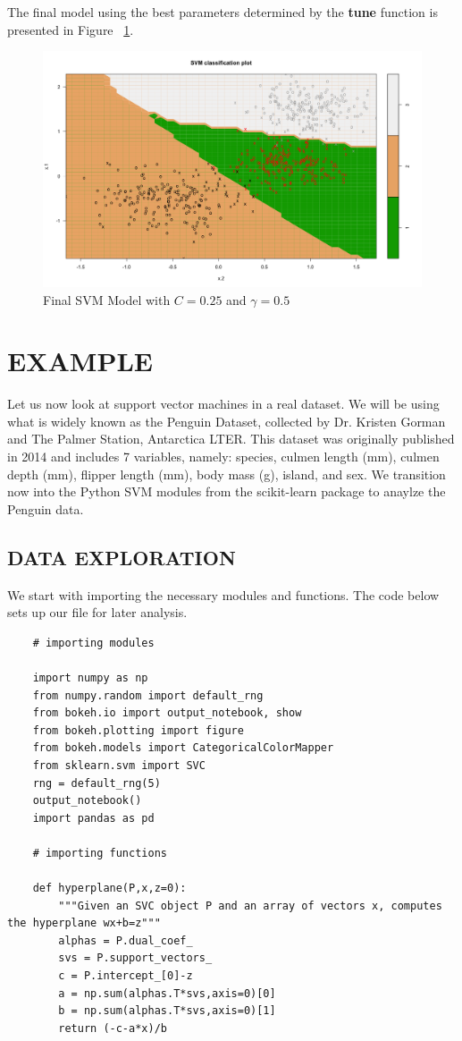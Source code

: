 \documentclass[12pt]{article}
\begin{document}
The final model using the best parameters determined by the \textbf{tune} function is presented in Figure ~\ref{fig_final_svm_model}.

\begin{figure}[H]
    \centering
    \includegraphics[width=5in]{Figures/svm/svm_final_model.png}
    \caption{Final SVM Model with \(C=0.25\) and \(\gamma = 0.5\)}
    \label{fig_final_svm_model}
\end{figure}

\section{EXAMPLE}

Let us now look at support vector machines in a real dataset. We will be using what is widely known as the Penguin Dataset, collected by Dr. Kristen Gorman and The Palmer Station, Antarctica LTER. This dataset was originally published in 2014 and includes 7 variables, namely: species, culmen length (mm), culmen depth (mm), flipper length (mm), body mass (g), island, and sex. We transition now into the Python SVM modules from the scikit-learn package to anaylze the Penguin data.

\subsection{DATA EXPLORATION}

We start with importing the necessary modules and functions. The code below sets up our file for later analysis.

\begin{verbatim}
    # importing modules
    
    import numpy as np
    from numpy.random import default_rng
    from bokeh.io import output_notebook, show
    from bokeh.plotting import figure
    from bokeh.models import CategoricalColorMapper
    from sklearn.svm import SVC
    rng = default_rng(5)
    output_notebook()
    import pandas as pd

    # importing functions

    def hyperplane(P,x,z=0):
        """Given an SVC object P and an array of vectors x, computes the hyperplane wx+b=z"""
        alphas = P.dual_coef_
        svs = P.support_vectors_
        c = P.intercept_[0]-z
        a = np.sum(alphas.T*svs,axis=0)[0]
        b = np.sum(alphas.T*svs,axis=0)[1]
        return (-c-a*x)/b
\end{verbatim}
\end{document}
